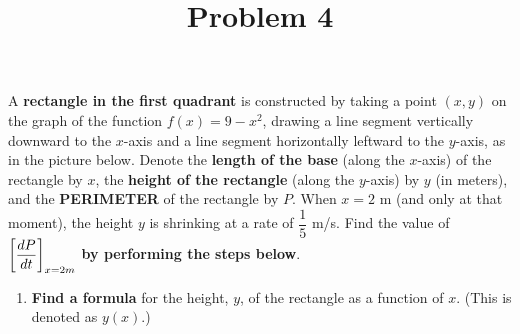 \documentclass{ximera}
\title[Problem 4]{Problem 4}
\begin{document}
\begin{abstract} \end{abstract}
\maketitle

\begin{problem}
	A \textbf{rectangle in the first quadrant} is constructed by taking a point $(x,y)$ on the graph of the function $f(x)=9-x^2$, drawing a line segment vertically downward 
		to the $x$-axis and a line segment horizontally leftward to the $y$-axis, as in the picture below. 
		Denote the \textbf{length of the base} (along the $x$-axis) of the rectangle by $x$, the 
		\textbf{height of the rectangle} (along the $y$-axis) by $y$ (in meters), and the \textbf{PERIMETER} of the rectangle by $P$. 
		When $x = 2$ m (and only at that moment), the height $y$ is shrinking at a rate of $\dfrac{1}{5}$ m/s.  
		Find the value of $\displaystyle \bigg[ \dfrac{dP}{dt} \bigg]_{x=2 m}$ \textbf{by performing the steps below}.\\
		\begin{center}
		\end{center}

		\begin{enumerate}			
			\item\label{partA} \textbf{Find a formula} for the height, $y$, of the rectangle as a function of $x$. (This is denoted as $y(x)$.) \\


\end{enumerate}
\end{problem}
\end{document}
